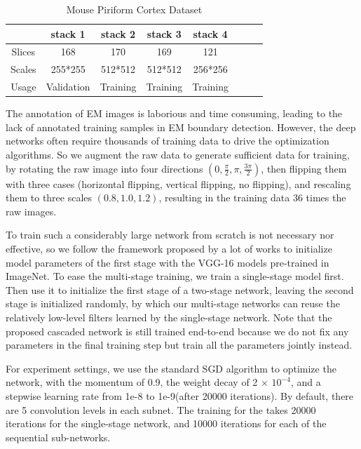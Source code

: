 \documentclass[senior]{IPSstyle}
\begin{document}
\begin{table}[t]
\renewcommand{\arraystretch}{1.2}
\caption{Mouse Piriform Cortex Dataset}
\label{piriform_dataset}
\begin{center}
\begin{tabular}{|c|c|c|c|c|c|c|c|}
\hline
\multicolumn{1}{|c|}{}
&\multicolumn{1}{c|}{stack 1}
&\multicolumn{1}{c|}{stack 2}
&\multicolumn{1}{c|}{stack 3}
&\multicolumn{1}{c|}{stack 4}
\\
\hline
Slices	&	168	&	170		&	169		&	121		\\	\hline
Scales	&	255*255	&	512*512		&	512*512		&	256*256		\\	\hline
Usage	&	Validation	&	Training		&	Training		&	Training		\\	\hline
\end{tabular}
\end{center}
\end{table}

The annotation of EM images is laborious and time consuming\cite{Helmstaedter2013}, leading to the lack of annotated training samples in EM boundary detection. However, the deep networks often require thousands of training data to drive the optimization algorithms. So we augment the raw data to generate sufficient data for training, by rotating the raw image into four directions \((0, \frac{\pi}{2}, \pi, \frac{3\pi}{2})\), then flipping them with three cases (horizontal flipping, vertical flipping, no flipping), and rescaling them to three scales \((0.8, 1.0, 1.2)\), resulting in the training data 36 times the raw images.

To train such a considerably large network from scratch is not necessary nor effective, so we follow the framework proposed by a lot of works\cite{Long2015, Xie2015, Shen2016CVPR} to initialize model parameters of the first stage with the VGG-16 models pre-trained in ImageNet\cite{Deng2009}. To ease the multi-stage training, we train a single-stage model first. Then use it to initialize the first stage of a two-stage network, leaving the second stage is initialized randomly, by which our multi-stage networks can reuse the relatively low-level filters learned by the single-stage network. Note that the proposed cascaded network is still trained end-to-end because we do not fix any parameters in the final training step but train all the parameters jointly instead. 

For experiment settings, we use the standard SGD algorithm to optimize the network, with the momentum of 0.9, the weight decay of 2 \(\times\) \(10^{-4}\), and a stepwise learning rate from 1e-8 to 1e-9(after 20000 iterations). By default, there are 5 convolution levels in each subnet. The training for the takes 20000 iterations for the single-stage network, and 10000 iterations for each of the sequential sub-networks. 
\end{document}
